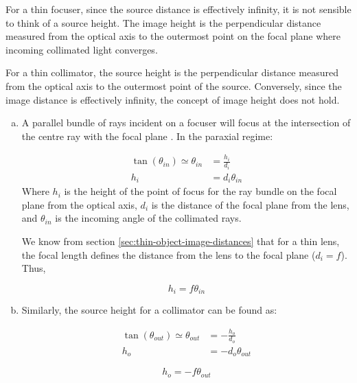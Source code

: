 For a thin focuser, since the source distance is effectively infinity, it is not sensible to think of a source height. The image height is the perpendicular distance measured from the optical axis to the outermost point on the focal plane where incoming collimated light converges.

For a thin collimator, the source height is the perpendicular distance measured from the optical axis to the outermost point of the source. Conversely, since the image distance is effectively infinity, the concept of image height does not hold.

\begin{enumerate}[(a)]
    \item A parallel bundle of rays incident on a focuser will focus at the intersection of the centre ray with the focal plane \cite{Boundless_undated-to, N_W_Edmund1968-fm}. In the paraxial regime:

    \begin{align}
    \tan\left( \theta_{in} \right) \simeq \theta_{in} &= \frac{h_i}{d_i} \\
    h_i &= d_i \theta_{in}
    \end{align}
    Where $h_i$ is the height of the point of focus for the ray bundle on the focal plane from the optical axis, $d_i$ is the distance of the focal plane from the lens, and $\theta_{in}$ is the incoming angle of the collimated rays.
    
    We know from section \ref{sec:thin-object-image-distances} that for a thin lens, the focal length defines the distance from the lens to the focal plane ($d_i = f$). Thus,
    
    \begin{equation} \label{eq:image-height}
        \boxed{h_i = f \theta_{in}}
    \end{equation}
    
    \item Similarly, the source height for a collimator can be found as:

    \begin{align}
    \tan\left(\theta_{out} \right) \simeq \theta_{out} &= -\frac{h_o}{d_o} \\
    h_o &= -d_o \theta_{out}
    \end{align}
    
    \begin{equation} \label{eq:source-height}
        \boxed{h_o = -f \theta_{out}}
    \end{equation}
\end{enumerate}

